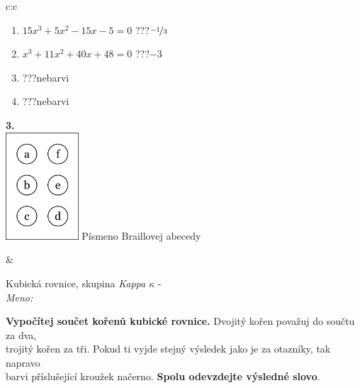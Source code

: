 \documentclass[10pt]{report}
\begin{document}
\begin{tabular}{c:c}
\begin{minipage}[c][104.5mm][t]{0.5\linewidth}
\begin{center}
\begin{minipage}{0.79\linewidth}
\begin{center}
\begin{varwidth}{\linewidth}
\begin{enumerate}
\item $15x^3+5x^2-15x-5=0$\quad \dotfill\; ???\;\dotfill \quad $\nicefrac{-1}{3}$
\item $x^3+11x^2+40x+48=0$\quad \dotfill\; ???\;\dotfill \quad $-3$
\item \quad \dotfill\; ???\;\dotfill \quad nebarvi
\item \quad \dotfill\; ???\;\dotfill \quad nebarvi
\end{enumerate}
\end{varwidth}
\end{center}
\end{minipage}
\begin{minipage}{0.20\linewidth}
\begin{center}
{\Huge\bfseries 3.} \\[2mm]
\includegraphics[height=40mm]{../images/braille.png}
{\small Písmeno Braillovej abecedy}
\end{center}
\end{minipage}
\end{center}
\end{minipage}
&
\begin{minipage}[c][104.5mm][t]{0.5\linewidth}
\begin{center}
\vspace{7mm}
{\huge Kubická rovnice, skupina \textit{Kappa $\kappa$} -}\\[5mm]
\textit{Meno:}\phantom{xxxxxxxxxxxxxxxxxxxxxxxxxxxxxxxxxxxxxxxxxxxxxxxxxxxxxxxxxxxxxxxxx}\\[5mm]
\begin{minipage}{0.95\linewidth}
\textbf{Vypočítej součet kořenů kubické rovnice.} Dvojitý kořen považuj do součtu za dva,\\trojitý kořen za tři. Pokud ti vyjde stejný výsledek jako je za otazníky, tak napravo\\barvi příslušející kroužek načerno. \textbf{Spolu odevzdejte výsledné slovo}.
\end{minipage}
\\[1mm]
\begin{minipage}{0.79\linewidth}
\begin{center}

\end{center}
\end{minipage}
\end{center}
\end{minipage}
\end{tabular}
\end{document}
